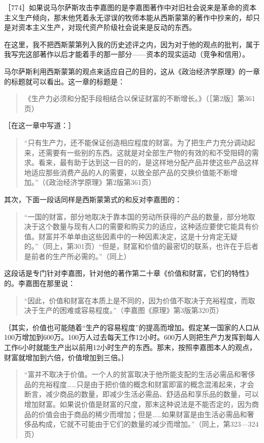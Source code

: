 ［774］如果说马尔萨斯攻击李嘉图的是李嘉图著作中对旧社会说来是革命的资本主义生产倾向，那末他凭着永无谬误的牧师本能从西斯蒙第的著作中抄来的，却只是对资本主义生产，对现代资产阶级社会说来是反动的东西。

在这里，我不把西斯蒙第列入我的历史述评之内，因为对于他的观点的批判，属于我写完这部著作以后才能着手的那一部分——资本的现实运动（竞争和信用）。

马尔萨斯利用西斯蒙第的观点来适应自己的目的，这从《政治经济学原理》的一章的标题就可以看出。这一章的标题是：

\begin{quote}{《生产力必须和分配手段相结合以保证财富的不断增长。》（［第2版］第361页）}\end{quote}

［在这一章中写道：］

\begin{quote}{“只有生产力，还不能保证创造相应程度的财富。为了把生产力充分调动起来，还需要有一些别的东西。这就是对全部生产物的有效的和不受阻碍的需求。看来，最有助于达到这一目的的，是这样地分配产品并使这些产品这样地适应那些消费产品的人的需要，以致全部产品的交换价值能不断增加。”（《政治经济学原理》第2版第361页）}\end{quote}

其次，下面一段话同样是西斯蒙第式的和反对李嘉图的：

\begin{quote}{“一国的财富，部分地取决于靠本国的劳动所获得的产品的数量，部分地取决于这个数量与现有人口的需要和购买力的适应，这种适应要使它能具有价值。财富并不单单由这些因素中的一种因素决定，这是十分肯定无疑的。”（同上，第301页）“但是，财富和价值的最密切的联系，也许在于后者是前者的生产所必需的。”（同上）}\end{quote}

这段话是专门针对李嘉图，针对他的著作第二十章《价值和财富，它们的特性》的。李嘉图在那里说：

\begin{quote}{“因此，价值和财富在本质上是不同的，因为价值不取决于充裕程度，而取决于生产的困难或容易程度。”（李嘉图《原理》第3版第320页）}\end{quote}

｛其实，价值也可能随着“生产的容易程度”的提高而增加。假定某一国家的人口从100万增加到600万。100万人过去每天工作12小时。600万人则把生产力发挥到每人工作6小时就能生产出以前用12小时生产的东西。那末，按照李嘉图本人的观点，财富就增加到六倍，价值增加到三倍。｝

\begin{quote}{“富并不取决于价值。一个人的贫富取决于他所能支配的生活必需品和奢侈品的充裕程度……只是由于把价值的概念和财富即富的概念混淆起来，才会断言，减少商品的数量，即减少生活必需品、舒适品和享乐品的数量，可以增加财富。如果说价值是财富的尺度，那末这种说法是不能否定的，因为商品的价值会由于商品的稀少而增加；但是……如果财富是由生活必需品和奢侈品构成，它就不可能由于它们的数量的减少而增加。”（同上，第323—324页）}\end{quote}

